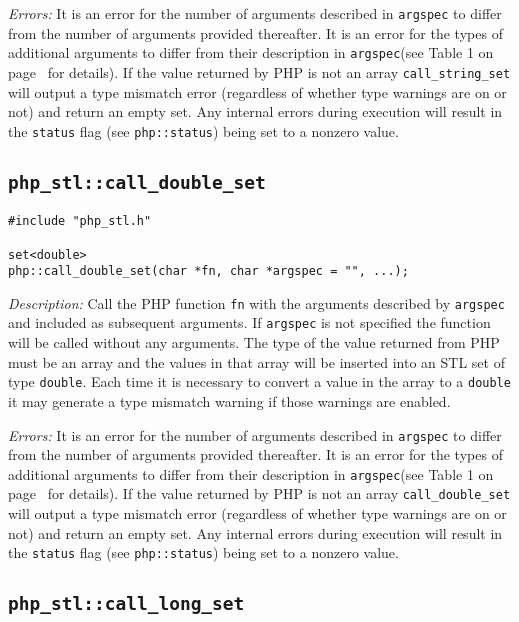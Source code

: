 \documentclass[11pt,titlepage]{article}
\begin{document}
\emph{Errors:} It is an error for the number of arguments described in \verb|argspec| to differ from the number of arguments provided thereafter. It is an error for the types of additional arguments to differ from their description in \verb|argspec|(see Table 1 on page~\pageref{Table1} for details). If the value returned by PHP is not an array \verb|call_string_set| will output a type mismatch error (regardless of whether type warnings are on or not) and return an empty set. Any internal errors during execution will result in the \verb|status| flag (see \verb|php::status|) being set to a nonzero value.


\subsection{\texttt{php\_stl::call\_double\_set}}

\begin{verbatim}
#include "php_stl.h"

set<double> 
php::call_double_set(char *fn, char *argspec = "", ...);
\end{verbatim}

\emph{Description:} Call the PHP function \verb|fn| with the arguments described by \verb|argspec| and included as subsequent arguments. If \verb|argspec| is not specified the function will be called without any arguments. The type of the value returned from PHP must be an array and the values in that array will be inserted into an STL set of type \verb|double|. Each time it is necessary to convert a value in the array to a \verb|double| it may generate a type mismatch warning if those warnings are enabled.

\emph{Errors:} It is an error for the number of arguments described in \verb|argspec| to differ from the number of arguments provided thereafter. It is an error for the types of additional arguments to differ from their description in \verb|argspec|(see Table 1 on page~\pageref{Table1} for details). If the value returned by PHP is not an array \verb|call_double_set| will output a type mismatch error (regardless of whether type warnings are on or not) and return an empty set. Any internal errors during execution will result in the \verb|status| flag (see \verb|php::status|) being set to a nonzero value.


\subsection{\texttt{php\_stl::call\_long\_set}}
\end{document}
